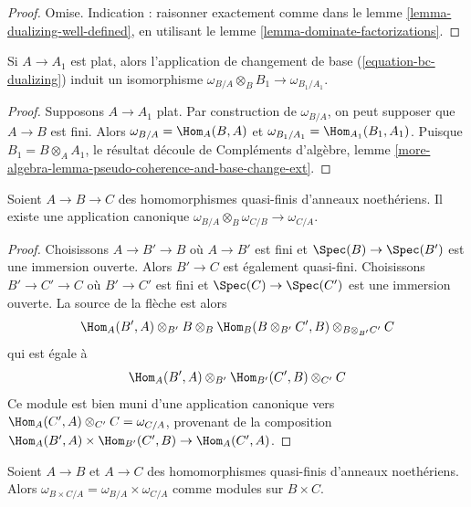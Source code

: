 \begin{proof}
Omise. Indication : raisonner exactement comme dans le
lemme \ref{lemma-dualizing-well-defined},
en utilisant le lemme \ref{lemma-dominate-factorizations}.
\end{proof}

\begin{lemma}
\label{lemma-dualizing-flat-base-change}
Si $A \to A_1$ est plat, alors
l'application de changement de base (\ref{equation-bc-dualizing}) induit un isomorphisme
$\omega_{B/A} \otimes_B B_1 \to \omega_{B_1/A_1}$.
\end{lemma}

\begin{proof}
Supposons $A \to A_1$ plat. Par construction de $\omega_{B/A}$, on peut
supposer que $A \to B$ est fini. Alors $\omega_{B/A} = \Hom_A(B, A)$ et
$\omega_{B_1/A_1} = \Hom_{A_1}(B_1, A_1)$. Puisque $B_1 = B \otimes_A A_1$,
le résultat découle de Compléments d'algèbre, lemme
\ref{more-algebra-lemma-pseudo-coherence-and-base-change-ext}.
\end{proof}

\begin{lemma}
\label{lemma-dualizing-composition}
Soient $A \to B \to C$ des homomorphismes quasi-finis d'anneaux noethériens.
Il existe une application canonique
$\omega_{B/A} \otimes_B \omega_{C/B} \to \omega_{C/A}$.
\end{lemma}

\begin{proof}
Choisissons $A \to B' \to B$ où $A \to B'$ est fini et
$\Spec(B) \to \Spec(B')$ est une immersion ouverte. Alors
$B' \to C$ est également quasi-fini. Choisissons $B' \to C' \to C$
où $B' \to C'$ est fini et $\Spec(C) \to \Spec(C')$ est une
immersion ouverte. La source de la flèche est alors
$$
\Hom_A(B', A) \otimes_{B'} B \otimes_B
\Hom_B(B \otimes_{B'} C', B) \otimes_{B \otimes_{B'} C'} C
$$
qui est égale à
$$
\Hom_A(B', A) \otimes_{B'}
\Hom_{B'}(C', B) \otimes_{C'} C
$$
Ce module est bien muni d'une application canonique vers
$\Hom_A(C', A) \otimes_{C'} C = \omega_{C/A}$,
provenant de la composition
$\Hom_A(B', A) \times \Hom_{B'}(C', B) \to \Hom_A(C', A)$.
\end{proof}

\begin{lemma}
\label{lemma-dualizing-product}
Soient $A \to B$ et $A \to C$ des homomorphismes quasi-finis d'anneaux noethériens.
Alors $\omega_{B \times C/A} = \omega_{B/A} \times \omega_{C/A}$
comme modules sur $B \times C$.
\end{lemma}

